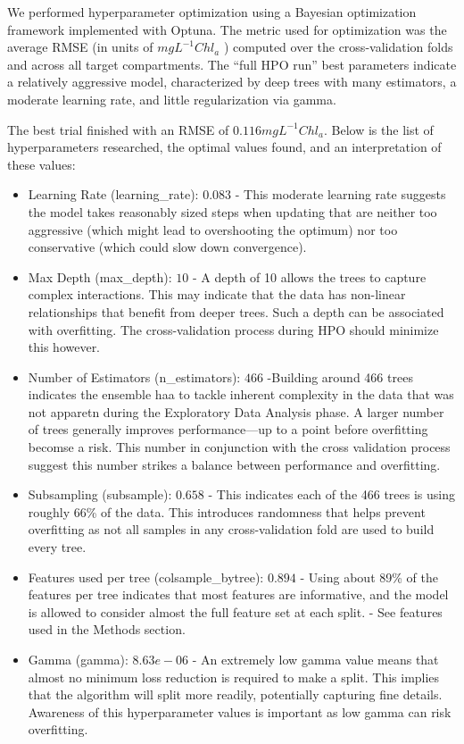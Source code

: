 \documentclass[
]{agujournal2019}
\begin{document}
We performed hyperparameter optimization using a Bayesian optimization
framework implemented with Optuna. The metric used for optimization was
the average RMSE (in units of \(mgL^{-1} Chl_a\) ) computed over the
cross-validation folds and across all target compartments. The ``full
HPO run'' best parameters indicate a relatively aggressive model,
characterized by deep trees with many estimators, a moderate learning
rate, and little regularization via gamma.

The best trial finished with an RMSE of \(0.116mgL^{-1} Chl_a\). Below
is the list of hyperparameters researched, the optimal values found, and
an interpretation of these values:

\begin{itemize}
\item
  Learning Rate (learning\_rate): \(0.083\) - This moderate learning
  rate suggests the model takes reasonably sized steps when updating
  that are neither too aggressive (which might lead to overshooting the
  optimum) nor too conservative (which could slow down convergence).
\item
  Max Depth (max\_depth): \(10\) - A depth of 10 allows the trees to
  capture complex interactions. This may indicate that the data has
  non-linear relationships that benefit from deeper trees. Such a depth
  can be associated with overfitting. The cross-validation process
  during HPO should minimize this however.
\item
  Number of Estimators (n\_estimators): \(466\) -Building around 466
  trees indicates the ensemble haa to tackle inherent complexity in the
  data that was not apparetn during the Exploratory Data Analysis phase.
  A larger number of trees generally improves performance---up to a
  point before overfitting becomse a risk. This number in conjunction
  with the cross validation process suggest this number strikes a
  balance between performance and overfitting.
\item
  Subsampling (subsample): \(0.658\) - This indicates each of the 466
  trees is using roughly 66\% of the data. This introduces randomness
  that helps prevent overfitting as not all samples in any
  cross-validation fold are used to build every tree.
\item
  Features used per tree (colsample\_bytree): \(0.894\) - Using about
  89\% of the features per tree indicates that most features are
  informative, and the model is allowed to consider almost the full
  feature set at each split. - See features used in the Methods section.
\item
  Gamma (gamma): \(8.63e-06\) - An extremely low gamma value means that
  almost no minimum loss reduction is required to make a split. This
  implies that the algorithm will split more readily, potentially
  capturing fine details. Awareness of this hyperparameter values is
  important as low gamma can risk overfitting.
\end{itemize}
\end{document}
